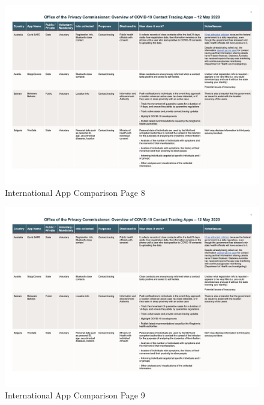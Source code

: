 \documentclass{scrreprt}
\begin{document}
\begin{figure}[H]
	\centering
	\includegraphics[page=8, width=0.9\linewidth]{2020-05-12-OPC-Comparison-of-COVID-19-Apps-colours}
	\caption{International App Comparison Page 8}
	\label{fig:8_2020-05-12-OPC-Comparison-of-COVID-19-Apps-colours}
\end{figure}
\begin{figure}[H]
	\centering
	\includegraphics[page=9, width=0.9\linewidth]{2020-05-12-OPC-Comparison-of-COVID-19-Apps-colours}
	\caption{International App Comparison Page 9}
	\label{fig:9_2020-05-12-OPC-Comparison-of-COVID-19-Apps-colours}
\end{figure}
\end{document}
